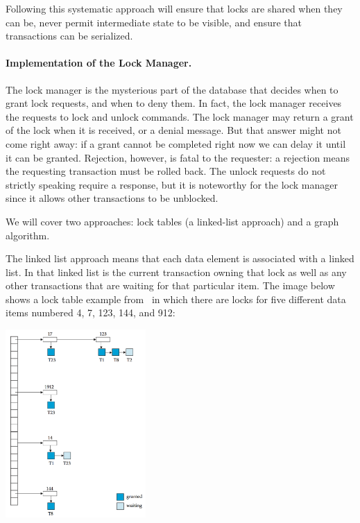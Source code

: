 Following this systematic approach will ensure that locks are shared when they can be, never permit intermediate state to be visible, and ensure that transactions can be serialized.

\paragraph{Implementation of the Lock Manager.} The lock manager is the mysterious part of the database that decides when to grant lock requests, and when to deny them. In fact, the lock manager receives the requests to lock and unlock commands. The lock manager may return a grant of the lock when it is received, or a denial message. But that answer might not come right away: if a grant cannot be completed right now we can delay it until it can be granted. Rejection, however, is fatal to the requester: a rejection means the requesting transaction must be rolled back. The unlock requests do not strictly speaking require a response, but it is noteworthy for the lock manager since it allows other transactions to be unblocked.

We will cover two approaches: lock tables (a linked-list approach) and a graph algorithm.

The linked list approach means that each data element is associated with a linked list. In that linked list is the current transaction owning that lock as well as any other transactions that are waiting for that particular item. The image below shows a lock table example from~\cite{dsc} in which there are locks for five different data items numbered 4, 7, 123, 144, and 912:

\begin{center}
	\includegraphics[width=0.4\textwidth]{images/lock-table}
\end{center}

